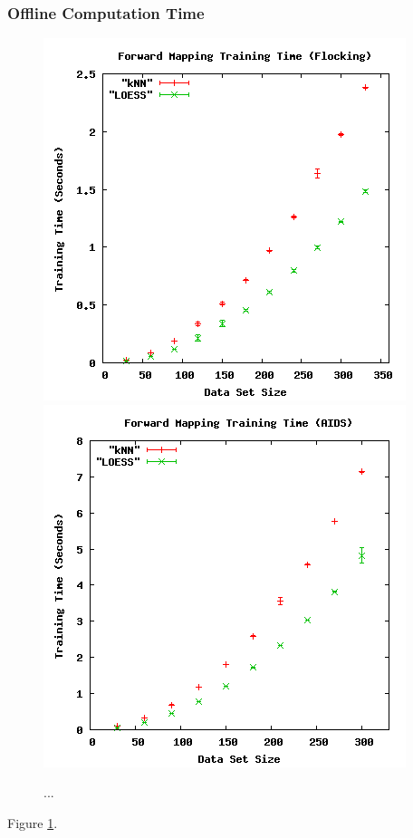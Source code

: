   \subsubsection{Offline Computation Time}

\begin{figure}[ht]
\centering
\includegraphics[scale=.4]{images/results_flocking/fmtraining.png}
\includegraphics[scale=.4]{images/results_aids/aids-fmtraining.png}
\caption{...}
\label{fig:fmtraining}
\end{figure}

Figure \ref{fig:fmtraining}.


